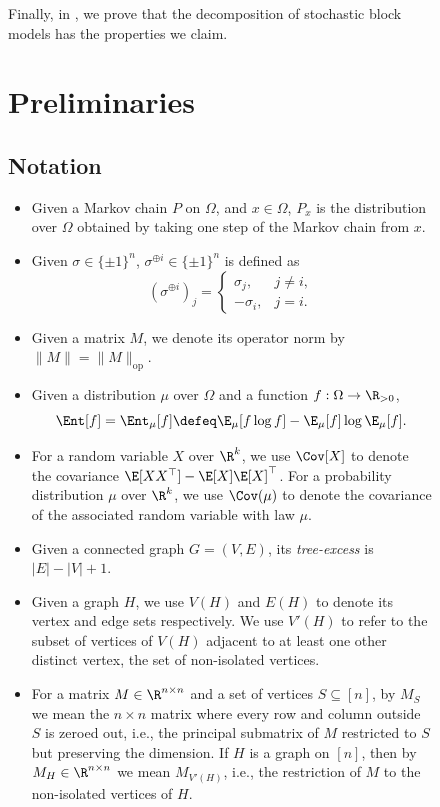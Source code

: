 \documentclass[11pt,letterpaper]{article}
\begin{document}
\begin{figure}
Finally, in , we prove that the decomposition of stochastic block models has the properties we claim.%


\section{Preliminaries}
\label{sec:prelims}

\subsection{Notation}

    \begin{itemize}
        \item Given a Markov chain $P$ on $\Omega$, and $x \in \Omega$, $P_x$ is the distribution over $\Omega$ obtained by taking one step of the Markov chain from $x$.
        \item Given $\sigma \in \{\pm 1\}^n$, $\sigma^{\oplus i} \in \{\pm 1\}^n$ is defined as
        \[ \left(\sigma^{\oplus i}\right)_j = \begin{cases} \sigma_j, & j \ne i, \\ -\sigma_i, & j = i. \end{cases} \]
        \item Given a matrix $M$, we denote its operator norm by $\|M\| = \|M\|_{\mathrm{op}}$.
        \item Given a distribution $\mu$ over $\Omega$ and a function $f : \Omega \to \R_{> 0}$,
        \[ \Ent[f] = \Ent_{\mu}[f] \defeq \E_{\mu}[f \log f] - \E_{\mu}[f] \log \E_{\mu}[f]. \]
        \item For a random variable $X$ over $\R^k$, we use $\Cov[X]$ to denote the covariance $\E[XX^\top] - \E[X]\E[X]^\top$. For a probability distribution $\mu$ over $\R^k$, we use $\Cov(\mu)$ to denote the covariance of the associated random variable with law $\mu$.
        \item Given a connected graph $G = (V,E)$, its \emph{tree-excess} is $|E|-|V|+1$.
        \item Given a graph $H$, we use $V(H)$ and $E(H)$ to denote its vertex and edge sets respectively. We use $V'(H)$ to refer to the subset of vertices of $V(H)$ adjacent to at least one other distinct vertex, the set of non-isolated vertices.
        \item For a matrix $M \in \R^{n \times n}$ and a set of vertices $S \subseteq [n]$, by $M_S$ we mean the $n \times n$ matrix where every row and column outside $S$ is zeroed out, i.e., the principal submatrix of $M$ restricted to $S$ but preserving the dimension. If $H$ is a graph on $[n]$, then by $M_H \in \R^{n \times n}$ we mean $M_{V'(H)}$, i.e., the restriction of $M$ to the non-isolated vertices of $H$.

\end{itemize}
\end{figure}
\end{document}
